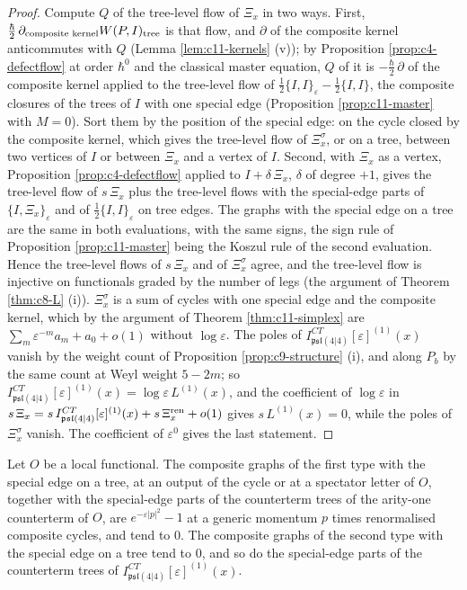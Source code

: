 \begin{proof}
Compute $Q$ of the tree-level flow of $\Xi_x$ in two ways. First, $\tfrac\hbar2\,\partial_{\text{composite kernel}}W(P,I)_{\rm tree}$ is that flow, and $\partial$ of the composite kernel anticommutes with $Q$ (Lemma \ref{lem:c11-kernels} (v)); by Proposition \ref{prop:c4-defectflow} at order $\hbar^0$ and the classical master equation, $Q$ of it is $-\tfrac\hbar2\,\partial$ of the composite kernel applied to the tree-level flow of $\tfrac12\{I,I\}_\varepsilon-\tfrac12\{I,I\}$, the composite closures of the trees of $I$ with one special edge (Proposition \ref{prop:c11-master} with $M=0$). Sort them by the position of the special edge: on the cycle closed by the composite kernel, which gives the tree-level flow of $\Xi^\sigma_x$, or on a tree, between two vertices of $I$ or between $\Xi_x$ and a vertex of $I$. Second, with $\Xi_x$ as a vertex, Proposition \ref{prop:c4-defectflow} applied to $I+\delta\,\Xi_x$, $\delta$ of degree $+1$, gives the tree-level flow of $s\,\Xi_x$ plus the tree-level flows with the special-edge parts of $\{I,\Xi_x\}_\varepsilon$ and of $\tfrac12\{I,I\}_\varepsilon$ on tree edges. The graphs with the special edge on a tree are the same in both evaluations, with the same signs, the sign rule of Proposition \ref{prop:c11-master} being the Koszul rule of the second evaluation. Hence the tree-level flows of $s\,\Xi_x$ and of $\Xi^\sigma_x$ agree, and the tree-level flow is injective on functionals graded by the number of legs (the argument of Theorem \ref{thm:c8-L} (i)). $\Xi^\sigma_x$ is a sum of cycles with one special edge and the composite kernel, which by the argument of Theorem \ref{thm:c11-simplex} are $\sum_m\varepsilon^{-m}a_m+a_0+o(1)$ without $\log\varepsilon$. The poles of $I^{CT}_{\mathfrak{psl}(4|4)}[\varepsilon]^{(1)}(x)$ vanish by the weight count of Proposition \ref{prop:c9-structure} (i), and along $P_b$ by the same count at Weyl weight $5-2m$; so $I^{CT}_{\mathfrak{psl}(4|4)}[\varepsilon]^{(1)}(x)=\log\varepsilon\,L^{(1)}(x)$, and the coefficient of $\log\varepsilon$ in $s\,\Xi_x=s\,I^{CT}_{\mathfrak{psl}(4|4)}[\varepsilon]^{(1)}(x)+s\,\Xi^{\rm ren}_x+o(1)$ gives $s\,L^{(1)}(x)=0$, while the poles of $\Xi^\sigma_x$ vanish. The coefficient of $\varepsilon^0$ gives the last statement.
\end{proof}

\begin{lemma}
\label{lem:c11-trees}
Let $O$ be a local functional. The composite graphs of the first type with the special edge on a tree, at an output of the cycle or at a spectator letter of $O$, together with the special-edge parts of the counterterm trees of the arity-one counterterm of $O$, are $e^{-\varepsilon|p|^2}-1$ at a generic momentum $p$ times renormalised composite cycles, and tend to $0$. The composite graphs of the second type with the special edge on a tree tend to $0$, and so do the special-edge parts of the counterterm trees of $I^{CT}_{\mathfrak{psl}(4|4)}[\varepsilon]^{(1)}(x)$.
\end{lemma}

